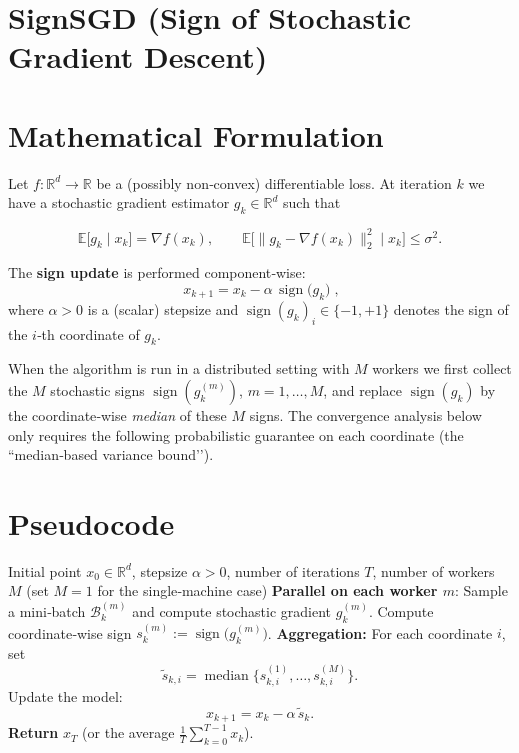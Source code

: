 \documentclass{article}
\newcommand{\sign}{\operatorname{sign}}
\newcommand{\E}{\mathbb{E}}
\newcommand{\R}{\mathbb{R}}
\begin{document}
\section*{SignSGD (Sign of Stochastic Gradient Descent)}

\section*{Mathematical Formulation}
Let $f:\R^{d}\rightarrow\R$ be a (possibly non‑convex) differentiable loss.  
At iteration $k$ we have a stochastic gradient estimator $g_k\in\R^{d}$ such that  

\[
\E\bigl[g_k\mid x_k\bigr]=\nabla f(x_k),\qquad 
\E\bigl[\|g_k-\nabla f(x_k)\|_2^{2}\mid x_k\bigr]\le\sigma^{2}.
\]

The \textbf{sign update} is performed component‑wise:
\[
\boxed{ \; x_{k+1}=x_{k}-\alpha\,\sign\!\bigl(g_k\bigr)\;},
\]
where $\alpha>0$ is a (scalar) stepsize and $\sign(g_k)_i\in\{-1,+1\}$ denotes the sign of the $i$‑th coordinate of $g_k$.

When the algorithm is run in a distributed setting with $M$ workers we first collect the $M$ stochastic signs $\sign(g_k^{(m)})$, $m=1,\dots,M$, and replace $\sign(g_k)$ by the coordinate‑wise \emph{median} of these $M$ signs.  The convergence analysis below only requires the following probabilistic guarantee on each coordinate (the “median‑based variance bound’’).

\section*{Pseudocode}
\begin{algorithm}[H]
\caption{SignSGD with optional majority‑vote (median) aggregation}
\begin{algorithmic}[1]
\Require Initial point $x_0\in\R^{d}$, stepsize $\alpha>0$, number of iterations $T$,
        number of workers $M$ (set $M=1$ for the single‑machine case)
    \State \textbf{Parallel on each worker $m$}:
    \State \hspace{1em} Sample a mini‑batch $\mathcal B_k^{(m)}$ and compute stochastic gradient $g_k^{(m)}$.
    \State \hspace{1em} Compute coordinate‑wise sign $s_k^{(m)}:=\sign\!\bigl(g_k^{(m)}\bigr)$.
    \State \textbf{Aggregation:}
    \State \hspace{1em} For each coordinate $i$, set
    \[
      \tilde s_{k,i}= \operatorname{median}\bigl\{s_{k,i}^{(1)},\dots,s_{k,i}^{(M)}\bigr\}.
    \]
    \State Update the model:
    \[
      x_{k+1}=x_{k}-\alpha\,\tilde s_{k}.
    \]
\EndFor
\State \textbf{Return} $x_T$ (or the average $\frac1T\sum_{k=0}^{T-1}x_k$).
\end{algorithmic}
\end{algorithm}
\end{document}
